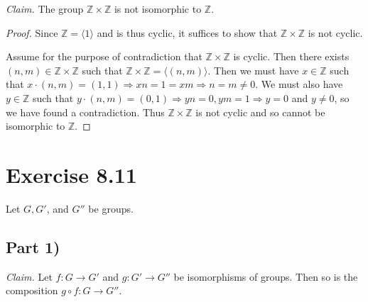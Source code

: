 \documentclass{abrice}
\newcommand{\Z}{\mathbb{Z}}
\newcommand{\Claim}{\emph{Claim.}\xspace}%
\begin{document}
\Claim The group $\Z \times \Z$ is not isomorphic to $\Z$.

\begin{proof}
  Since $\Z = \langle 1 \rangle$ and is thus cyclic, it suffices to show that
  $\Z \times \Z$ is not cyclic.

  Assume for the purpose of contradiction that $\Z \times \Z$ is cyclic. Then
  there exists $(n,m) \in \Z \times \Z$ such that $\Z \times \Z = \langle (n,m) \rangle$.
  Then we must have $x \in \Z$ such that $x \cdot (n,m) = (1,1) \Rightarrow xn =
  1 = xm \Rightarrow n = m \neq 0$. We must also have $y \in \Z$ such that $y
  \cdot (n,m) = (0,1) \Rightarrow yn = 0, ym = 1 \Rightarrow y = 0$ and $y \neq
  0$, so we have found a contradiction. Thus $\Z \times \Z$ is not cyclic and so
  cannot be isomorphic to $\Z$.
\end{proof}

\section{Exercise 8.11}

Let $G, G'$, and $G''$ be groups.

\subsection{Part 1)}

\Claim Let $f : G \to G'$ and $g : G' \to G''$ be isomorphisms of groups. Then
so is the composition $g \circ f : G \to G''$.
\end{document}
